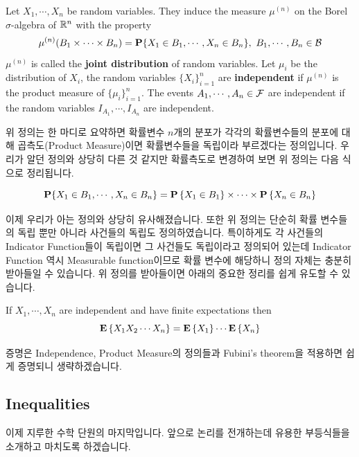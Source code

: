 \documentclass[final]{IEEEphot}
\begin{document}
\begin{definition}
	Let $X_1,\cdots,X_n$ be random variables. They induce the measure $\mu^{(n)}$ on the Borel $\sigma$-algebra of $\mathbb{R}^n$ with the property
	$$\mu^{(n)}(B_1 \times \cdots \times B_n) = \mathbf{P}\{X_1 \in B_1, \cdots,X_n \in B_n \}, ~ B_1,\cdots,B_n \in \mathcal{B}$$
	$\mu^{(n)}$ is called the \textbf{joint distribution} of random variables. Let $\mu_i$ be the distribution of $X_i$, the random variables $\{X_i\}_{i=1}^{n}$ are \textbf{independent} if $\mu^{(n)}$ is the product measure of $\{\mu_i\}_{i=1}^n$. The events $A_1, \cdots, A_n \in \mathcal{F}$ are independent if the random variables $I_{A_1}, \cdots, I_{A_n}$ are independent.
	
	\HL 
\end{definition}

위 정의는 한 마디로 요약하면 확률변수 $n$개의 분포가 각각의 확률변수들의 분포에 대해 곱측도(Product Measure)이면 확률변수들을 독립이라 부르겠다는 정의입니다. 우리가 알던 정의와 상당히 다른 것 같지만 확률측도로 변경하여 보면 위 정의는 다음 식으로 정리됩니다.

$$\mathbf{P}\{X_1 \in B_1, \cdots,X_n \in B_n \} = \mathbf{P}\left\{ X_1 \in B_1 \right\} \times \cdots \times \mathbf{P}\left\{ X_n \in B_n \right\}$$

이제 우리가 아는 정의와 상당히 유사해졌습니다. 또한 위 정의는 단순히 확률 변수들의 독립 뿐만 아니라 사건들의 독립도 정의하였습니다. 특이하게도 각 사건들의 Indicator Function들이 독립이면 그 사건들도 독립이라고 정의되어 있는데 Indicator Function 역시 Measurable function이므로 확률 변수에 해당하니 정의 자체는 충분히 받아들일 수 있습니다. 위 정의를 받아들이면 아래의 중요한 정리를 쉽게 유도할 수 있습니다.

\begin{theorem}
	If $X_1,\cdots , X_n$ are independent and have finite expectations then
	$$ \mathbf{E} \left\{ X_1X_2\cdots X_n \right\} = \mathbf{E}\left\{ X_1 \right\} \cdots \mathbf{E}\left\{ X_n \right\}$$
	
	\HL
\end{theorem}

증명은 Independence, Product Measure의 정의들과 Fubini's theorem을 적용하면 쉽게 증명되니 생략하겠습니다.

\newpage

\subsection{Inequalities}

\HS 이제 지루한 수학 단원의 마지막입니다. 앞으로 논리를 전개하는데 유용한 부등식들을 소개하고 마치도록 하겠습니다.
\end{document}
